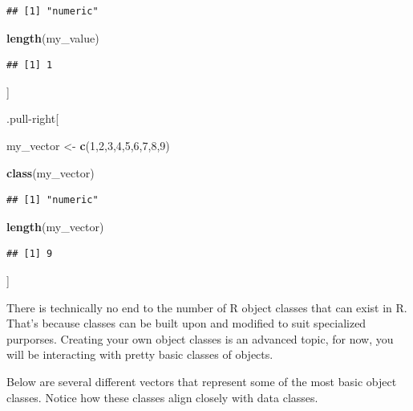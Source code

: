 \documentclass[
]{book}
\newenvironment{Shaded}{\begin{snugshade}}{\end{snugshade}}
\newcommand{\DecValTok}[1]{\textcolor[rgb]{0.00,0.00,0.81}{#1}}
\newcommand{\FunctionTok}[1]{\textcolor[rgb]{0.13,0.29,0.53}{\textbf{#1}}}
\newcommand{\NormalTok}[1]{#1}
\newcommand{\OtherTok}[1]{\textcolor[rgb]{0.56,0.35,0.01}{#1}}
\begin{document}
\begin{verbatim}
## [1] "numeric"
\end{verbatim}

\begin{Shaded}
\begin{Highlighting}[]
\FunctionTok{length}\NormalTok{(my\_value)}
\end{Highlighting}
\end{Shaded}

\begin{verbatim}
## [1] 1
\end{verbatim}

{]}

.pull-right{[}

\begin{Shaded}
\begin{Highlighting}[]
\NormalTok{my\_vector }\OtherTok{\textless{}{-}} \FunctionTok{c}\NormalTok{(}\DecValTok{1}\NormalTok{,}\DecValTok{2}\NormalTok{,}\DecValTok{3}\NormalTok{,}\DecValTok{4}\NormalTok{,}\DecValTok{5}\NormalTok{,}\DecValTok{6}\NormalTok{,}\DecValTok{7}\NormalTok{,}\DecValTok{8}\NormalTok{,}\DecValTok{9}\NormalTok{)}

\FunctionTok{class}\NormalTok{(my\_vector)}
\end{Highlighting}
\end{Shaded}

\begin{verbatim}
## [1] "numeric"
\end{verbatim}

\begin{Shaded}
\begin{Highlighting}[]
\FunctionTok{length}\NormalTok{(my\_vector)}
\end{Highlighting}
\end{Shaded}

\begin{verbatim}
## [1] 9
\end{verbatim}

{]}

There is technically no end to the number of R object classes that can exist in R. That's because classes can be built upon and modified to suit specialized purporses. Creating your own object classes is an advanced topic, for now, you will be interacting with pretty basic classes of objects.

Below are several different vectors that represent some of the most basic object classes. Notice how these classes align closely with data classes.
\end{document}
